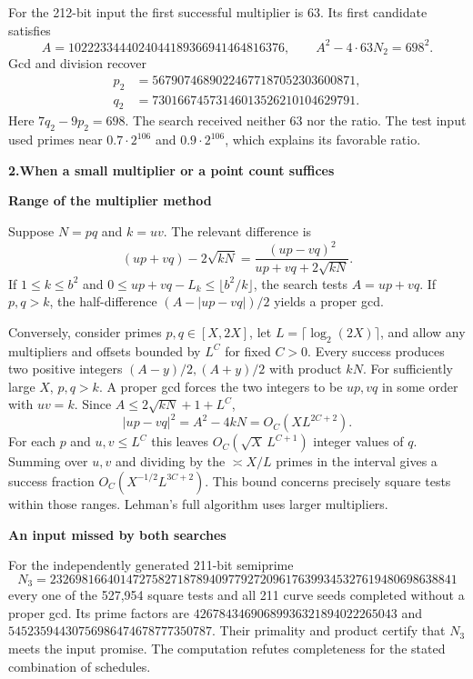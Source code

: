 \documentclass[12pt,letterpaper]{article}
\newcommand{\sect}[1]{{\large\sffamily\bfseries\color{ink}#1}\par}
\newcommand{\subh}[1]{{\sffamily\bfseries\color{accent}#1}\par}
\begin{document}
For the 212-bit input the first successful multiplier is $63$. Its first candidate satisfies
\[
 A=1022233444024044189366941464816376,\qquad A^2-4\cdot63N_2=698^2 .
\]
Gcd and division recover
\[
\begin{aligned}
 p_2&=56790746890224677187052303600871,\\
 q_2&=73016674573146013526210104629791 .
\end{aligned}
\]
Here $7q_2-9p_2=698$. The search received neither 63 nor the ratio. The test input used primes near $0.7\cdot 2^{106}$ and $0.9\cdot 2^{106}$, which explains its favorable ratio.
\newpage

\sect{2.\quad When a small multiplier or a point count suffices}
\subh{Range of the multiplier method}
Suppose $N=pq$ and $k=uv$. The relevant difference is
\[
 (up+vq)-2\sqrt{kN}=\frac{(up-vq)^2}{up+vq+2\sqrt{kN}} .
\]
If $1\le k\le b^2$ and $0\le up+vq-L_k\le\lfloor b^2/k\rfloor$, the search tests $A=up+vq$. If $p,q>k$, the half-difference $(A-|up-vq|)/2$ yields a proper gcd.

Conversely, consider primes $p,q\in[X,2X]$, let $L=\lceil\log_2(2X)\rceil$, and allow any multipliers and offsets bounded by $L^C$ for fixed $C>0$. Every success produces two positive integers $(A-y)/2,(A+y)/2$ with product $kN$. For sufficiently large $X$, $p,q>k$. A proper gcd forces the two integers to be $up,vq$ in some order with $uv=k$. Since $A\le2\sqrt{kN}+1+L^C$,
\[
 |up-vq|^2=A^2-4kN=O_C(XL^{2C+2}).
\]
For each $p$ and $u,v\le L^C$ this leaves $O_C(\sqrt X\,L^{C+1})$ integer values of $q$. Summing over $u,v$ and dividing by the $\asymp X/L$ primes in the interval gives a success fraction $O_C(X^{-1/2}L^{3C+2})$. This bound concerns precisely square tests within those ranges. Lehman's full algorithm uses larger multipliers.

\subh{An input missed by both searches}
For the independently generated 211-bit semiprime
\[
 N_3=2326981664014727582718789409779272096176399345327619480698638841
\]
every one of the 527,954 square tests and all 211 curve seeds completed without a proper gcd. Its prime factors are $42678434690689936321894022265043$ and $54523594430756986474678777350787$. Their primality and product certify that $N_3$ meets the input promise. The computation refutes completeness for the stated combination of schedules.
\end{document}
